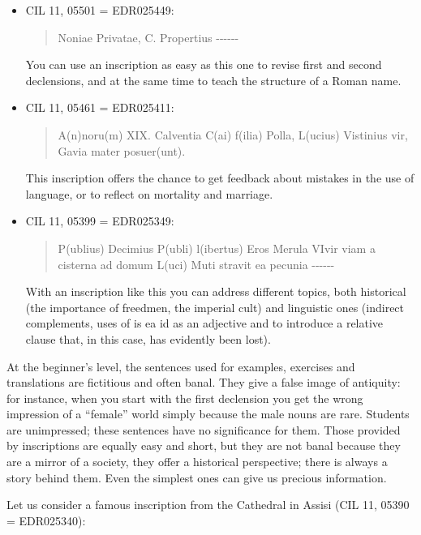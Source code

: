 \documentclass[amsthm,ebook]{saparticle}
\begin{document}
\begin{itemize}
\item CIL 11, 05501 = EDR025449: \begin{quotation}
Noniae Privatae, C. Propertius -{}-{}-{}-{}-{}-
\end{quotation}

You can use an inscription as easy as this one to revise first and second declensions, and at the same time to teach the
structure of a Roman name.

\item CIL 11, 05461 = EDR025411: \begin{quotation}
A(n)noru(m) XIX. Calventia C(ai) f(ilia) Polla, L(ucius)
Vistinius vir, Gavia mater posuer(unt). 

\end{quotation}
This inscription offers the chance to get feedback about mistakes in the use of language, or to reflect on mortality and
marriage.

\item CIL 11, 05399 = EDR025349: \begin{quotation}
P(ublius) Decimius P(ubli) l(ibertus) Eros Merula VIvir
viam a cisterna ad domum L(uci) Muti stravit ea pecunia -{}-{}-{}-{}-{}- 
\end{quotation}

With an inscription like this you can address different topics, both historical (the importance of freedmen, the
imperial cult) and linguistic ones (indirect complements, uses of is ea id as an adjective and to introduce a relative
clause that, in this case, has evidently been lost).
\end{itemize}





At the beginner’s level, the sentences used for examples, exercises and translations are fictitious and often banal.
They give a false image of antiquity: for instance, when you start with the first declension you get the wrong
impression of a ``female'' world simply because the male nouns are rare. Students are unimpressed; these sentences have
no significance for them. Those provided by inscriptions are equally easy and short, but they are not banal because
they are a mirror of a society, they offer a historical perspective; there is always a story behind them. Even the
simplest ones can give us precious information.

Let us consider a famous inscription from the Cathedral in Assisi (CIL 11, 05390 = EDR025340):
\end{document}
